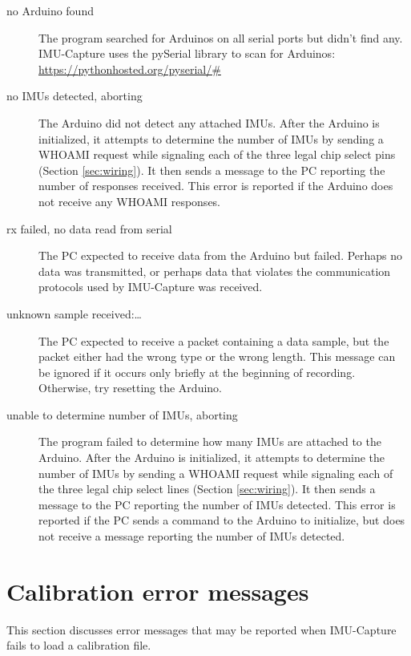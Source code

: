 \documentclass[11pt,letterpaper,article,oneside]{memoir}
\newcommand{\name}{IMU-Capture}
\begin{document}
\begin{description}
\item[no Arduino found]
The program searched for Arduinos on all serial ports but didn't find any.
\name{} uses the pySerial library to scan for Arduinos:
\url{https://pythonhosted.org/pyserial/#}

\item[no IMUs detected, aborting]
The Arduino did not detect any attached IMUs.  After the Arduino is initialized,
it attempts to determine the number of IMUs by sending a WHOAMI request while
signaling each of the three legal chip select pins (Section \ref{sec:wiring}).
It then sends a message to the PC reporting the number of responses received. This
error is reported if the Arduino does not receive any WHOAMI responses.
\genericFix{}

\item[rx failed, no data read from serial]
The PC expected to receive data from the Arduino but failed. Perhaps no data was
transmitted, or perhaps data that violates the communication protocols used by
\name{} was received.
\genericFix{}

\item[unknown sample received:\dots]
The PC expected to receive a packet containing a data sample, but the packet
either had the wrong type or the wrong length. This message can be ignored if it
occurs only briefly at the beginning of recording. Otherwise, try resetting the
Arduino.

\item[unable to determine number of IMUs, aborting]
The program failed to determine how many IMUs are attached to the Arduino. After
the Arduino is initialized, it attempts to determine the number of IMUs by
sending a WHOAMI request while signaling each of the three legal chip select
lines (Section \ref{sec:wiring}). It then sends a message to the PC reporting the
number of IMUs detected. This error is reported if the PC sends a
command to the Arduino to initialize, but does not receive a message reporting
the number of IMUs detected.
\genericFix{}

\end{description}

\section{Calibration error messages}
\label{sec:calibErrorMessages}

This section discusses error messages that may be reported when \name{} fails
to load a calibration file.
\end{document}
